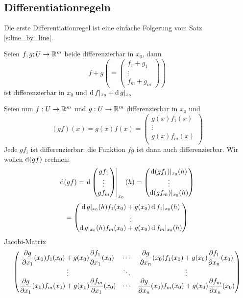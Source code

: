 \subsection{Differentiationregeln}
Die erste Differentiationregel ist eine einfache Folgerung  vom Satz \ref{s:line_by_line}.
\begin{Sat}
Seien
  $f,g;U\rightarrow\mathbb{R}^m$ beide differenzierbar in $x_0$, dann
  \[f+g\left( = \begin{pmatrix}
    f_1+g_1\\
    \vdots \\
    f_m+g_m
  \end{pmatrix} \right)\]
  ist differenzierbar in $x_0$ und $\operatorname{d} f|_{x_0}+\operatorname{d} g|_{x_0}$
\end{Sat}
Seien nun
  $f:U\rightarrow\mathbb{R}^m$ und $g:U\rightarrow\mathbb{R}^m$ differenzierbar in $x_0$
und
  \[(gf)(x)=g(x)f(x)= \begin{pmatrix}
    g(x)f_1(x) \\
    \vdots \\
    g(x)f_m(x) \\
  \end{pmatrix}\]
Jede $g f_i$ ist differenzierbar: die Funktion $fg$ ist dann auch
differenzierbar. Wir wollen $\operatorname{d} (gf)$ rechnen:
  \[\operatorname{d} (gf)=\left.\operatorname{d} \begin{pmatrix}
    gf_1 \\ \vdots\\ g f_m
  \end{pmatrix} \right|_{x_0}(h) = \begin{pmatrix}
    \operatorname{d} (gf_1)|_{x_0}(h)\\
    \vdots \\
    \operatorname{d} (gf_m)|_{x_0}(h)\\
  \end{pmatrix} \]
  \[ = \begin{pmatrix}
    \operatorname{d} g|_{x_0}(h)f_1(x_0)+g(x_0)\operatorname{d} f_1|_{x_0}(h)\\
    \vdots \\
    \operatorname{d} g|_{x_0}(h)f_m(x_0)+g(x_0)\operatorname{d} f_m|_{x_0}(h)\\
  \end{pmatrix} \]
  Jacobi-Matrix
  \[ \begin{pmatrix}
    \dfrac{\partial g}{\partial x_1}(x_0)f_1(x_0)+g(x_0)\dfrac{\partial f_1}{\partial x_1}(x_0) & \cdots & \dfrac{\partial g}{\partial x_n}(x_0)f_1(x_0)+g(x_0)\dfrac{\partial f_1}{\partial x_n}(x_0) \\
    \vdots & \ddots & \vdots \\
    \dfrac{\partial g}{\partial x_1}(x_0)f_m(x_0)+g(x_0)\dfrac{\partial f_m}{\partial x_1}(x_0) & \cdots & \dfrac{\partial g}{\partial x_n}(x_0)f_m(x_0)+g(x_0)\dfrac{\partial f_m}{\partial x_n}(x_0) \\
  \end{pmatrix} \]
